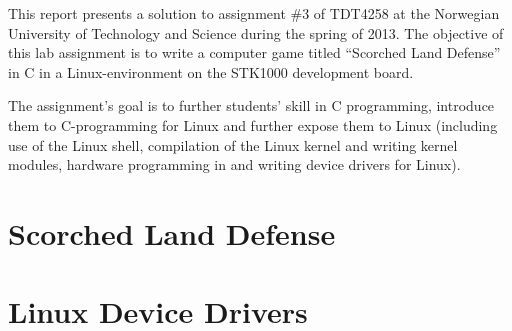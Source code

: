 This report presents a solution to assignment \#3 of TDT4258 at the Norwegian University of Technology and Science during the spring of 2013. The objective of this lab assignment is to write a computer game titled ``Scorched Land Defense'' in C in a Linux-environment on the STK1000 development board. 

The assignment's goal is to further students' skill in C programming, introduce them to C-programming for Linux and further expose them to Linux (including use of the Linux shell, compilation of the Linux kernel and writing kernel modules, hardware programming in and writing device drivers for Linux).

\section{Scorched Land Defense}
	

\section{Linux Device Drivers}
	
	